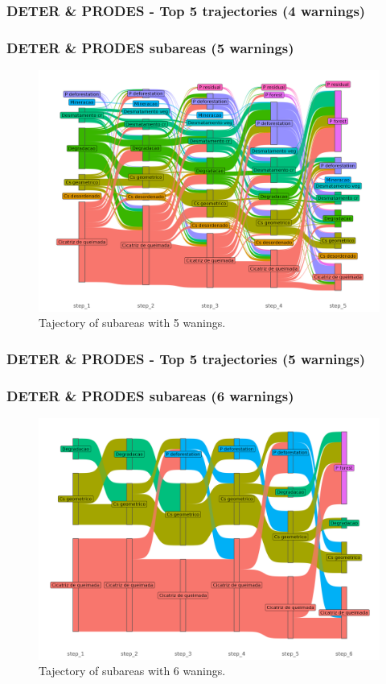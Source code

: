 \documentclass[aspectratio=169]{beamer}
\begin{document}
\begin{frame}[allowframebreaks]
    \frametitle{DETER \& PRODES - Top 5 trajectories (4 warnings)}
    
\end{frame}

\begin{frame}
    \frametitle{DETER \& PRODES subareas (5 warnings)}
    \begin{figure}[h] 
        \includegraphics[width=0.65\linewidth]
        {./figures/plot_deter_prodes_subarea_trajectory_5.png}
        \caption{Tajectory of subareas with 5 wanings.}
        \label{fig:deter_prodes_subarea_trajectory_5}
    \end{figure}
\end{frame}

\begin{frame}[allowframebreaks]
    \frametitle{DETER \& PRODES - Top 5 trajectories (5 warnings)}
    
\end{frame}

\begin{frame}
    \frametitle{DETER \& PRODES subareas (6 warnings)}
    \begin{figure}[h] 
        \includegraphics[width=0.65\linewidth]
        {./figures/plot_deter_prodes_subarea_trajectory_6.png}
        \caption{Tajectory of subareas with 6 wanings.}
        \label{fig:deter_prodes_subarea_trajectory_6}
    \end{figure}
\end{frame}
\end{document}
